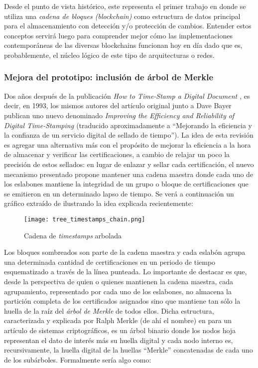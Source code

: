Desde el punto de vista histórico, este representa el primer trabajo en donde se utiliza una \textit{cadena de bloques (blockchain)} como estructura de datos principal para el almacenamiento con detección y/o protección de cambios. Entender estos conceptos servirá luego para comprender mejor cómo las implementaciones contemporáneas de las diversas blockchains funcionan hoy en día dado que es, probablemente, el núcleo lógico de este tipo de arquitecturas o redes.

\subsubsection{Mejora del prototipo: inclusión de árbol de Merkle}
\label{bc_origins_merkle}

Dos años después de la publicación \textit{How to Time-Stamp a Digital Document \cite{Haber:1991:TDD:2724969.2725089}}, es decir, en 1993, los mismos autores del artículo original junto a Dave Bayer publican uno nuevo denominado \textit{Improving the Efficiency and Reliability of Digital Time-Stamping \cite{BayerHaberStornetta1993}} (traducido aproximadamente a ``Mejorando la eficiencia y la confianza de un servicio digital de sellado de tiempo''). La idea de esta revisión es agregar una alternativa más con el propósito de mejorar la eficiencia a la hora de almacenar y verificar las certificaciones, a cambio de relajar un poco la precisión de estos sellados: en lugar de enlazar y sellar cada certificación, el nuevo mecanismo presentado propone mantener una cadena maestra donde cada uno de los eslabones mantiene la integridad de un grupo o bloque de certificaciones que se emitieron en un determinado lapso de tiempo. Se verá a continuación un gráfico extraído de \cite{Narayanan:2016:BCT:2994437} ilustrando la idea explicada recientemente:

\begin{figure}[H]
  \texttt{[image: tree\_timestamps\_chain.png]}
  \centering
  \caption{Cadena de \textit{timestamps} arbolada }
  \label{fig:tree-timestamps-chain}
\end{figure}

Los bloques sombreados son parte de la cadena maestra y cada eslabón agrupa una determinada cantidad de certificaciones en un periodo de tiempo esquematizado a través de la línea punteada. Lo importante de destacar es que, desde la perspectiva de quien o quienes mantienen la cadena maestra, cada agrupamiento, representado por cada uno de los eslabones, no almacena la partición completa de los certificados asignados sino que mantiene tan sólo la huella de la raíz del \textit{árbol de Merkle} de todos ellos. Dicha estructura, caracterizada y explicada por Ralph Merkle (de ahí el nombre) en \cite{Merkle1980} para un artículo de sistemas criptográficos, es un árbol binario donde los nodos hoja representan el dato de interés más su huella digital y cada nodo interno es, recursivamente, la huella digital de la huellas ``Merkle'' concatenadas de cada uno de los subárboles. Formalmente sería algo como:

